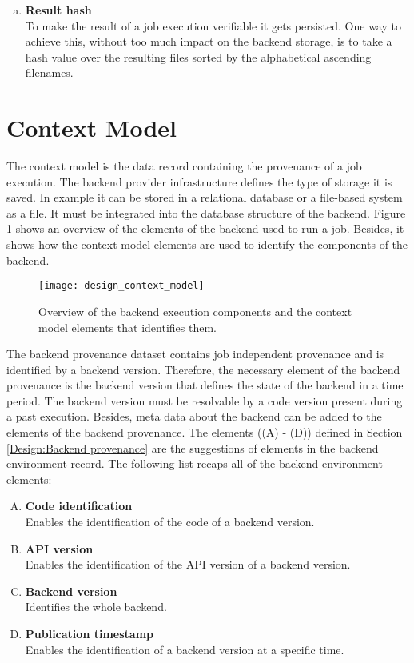 \documentclass[draft,final]{vutinfth} %
\begin{document}
\begin{enumerate}[(f)]
	\item \textbf{Result hash} \\
	To make the result of a job execution verifiable it gets persisted. One way to achieve this, without too much impact on the backend storage, is to take a hash value over the resulting files sorted by the alphabetical ascending filenames.
\end{enumerate}

\newpage
\section{Context Model}\label{Design:Context Model}

The context model is the data record containing the provenance of a job execution. The backend provider infrastructure defines the type of storage it is saved. In example it can be stored in a relational database or a file-based system as a file. It must be integrated into the database structure of the backend. Figure \ref{fig:design_contextmodel} shows an overview of the elements of the backend used to run a job. Besides, it shows how the context model elements are used to identify the components of the backend.

\begin{figure}[h]
	\centering
	\texttt{[image: design\_context\_model]}
	\caption{Overview of the backend execution components and the context model elements that identifies them.}
	\label{fig:design_contextmodel} 
\end{figure}

The backend provenance dataset contains job independent provenance and is identified by a backend version. Therefore, the necessary element of the backend provenance is the backend version that defines the state of the backend in a time period. The backend version must be resolvable by a code version present during a past execution. Besides, meta data about the backend can be added to the elements of the backend provenance. The elements ((A) - (D)) defined in Section \ref{Design:Backend provenance} are the suggestions of elements in the backend environment record. The following list recaps all of the backend environment elements: 
\newpage
\begin{enumerate}[(A)]
	\item \textbf{Code identification} \\
	Enables the identification of the code of a backend version.
	\item \textbf{API version} \\
	Enables the identification of the API version of a backend version.
	\item \textbf{Backend version} \\ 
	Identifies the whole backend.
	\item \textbf{Publication timestamp} \\ 
	Enables the identification of a backend version at a specific time.
\end{enumerate}
\end{document}
